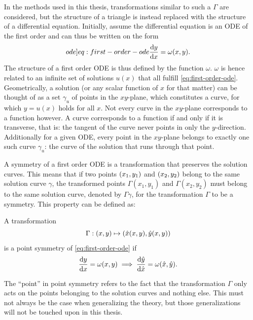 In the methods used in this thesis, transformations similar to such a \(\Gamma\) are considered, but the structure of a triangle is instead replaced with the structure of a differential equation.
Initially, assume the differential equation is an ODE of the first order and can thus be written on the form
\begin{equation} \label[ode]{eq:first-order-ode}
  \diff{y}{x} = \omega(x,y).
\end{equation}
The structure of a first order ODE is thus defined by the function \(\omega\).
\(\omega\) is hence related to an infinite set of solutions \(u(x)\) that all fulfill \cref{eq:first-order-ode}.
Geometrically, a solution (or any scalar function of \(x\) for that matter) can be thought of as a set \(\gamma_u\) of points in the \(xy\)-plane, which constitutes a curve, for which \(y = u(x)\) holds for all \(x\).
Not every curve in the \(xy\)-plane corresponds to a function however.
A curve corresponds to a function if and only if it is transverse, that is: the tangent of the curve never points in only the \(y\)-direction.
Additionally for a given ODE, every point in the \(xy\)-plane belongs to exactly one such curve \(\gamma_u\): the curve of the solution that runs through that point.

A symmetry of a first order ODE  is a transformation that preserves the solution curves.
This means that if two points \(\pqty{x_1,y_1}\) and \(\pqty{x_2,y_2}\) belong to the same solution curve \(\gamma\), the transformed points \(\Gamma(x_1,y_1)\) and \(\Gamma(x_2,y_2)\) must belong to the same solution curve, denoted by \(\Gamma\gamma\), for the transformation \(\Gamma\) to be a symmetry.
This property can be defined as:
\begin{defn} \label{defn:first-order-symmetry}
  A transformation 
  \begin{equation}
    \Gamma: \pqty{x,y} \mapsto \pqty{\hat{x}(x,y), \hat{y}(x,y)}
  \end{equation}
  is a point symmetry of \cref{eq:first-order-ode} if
  \begin{equation}
    \diff{y}{x} = \omega(x,y)
    \implies
    \diff{\hat{y}}{\hat{x}} = \omega(\hat{x},\hat{y}).
  \end{equation}
\end{defn}
The \enquote{point} in point symmetry refers to the fact that the transformation \(\Gamma\) only acts on the points belonging to the solution curves and nothing else.
This must not always be the case when generalizing the theory, but those generalizations will not be touched upon in this thesis.

